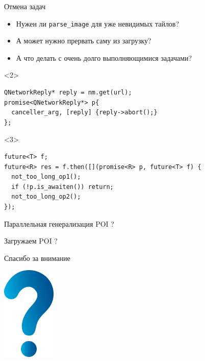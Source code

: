 \documentclass[aspectratio=169,pdf,hyperref={unicode},14pt]{beamer}
\begin{document}
\begin{frame}[fragile,t]{Отмена задач}
 \begin{itemize}[<+->]
  \item Нужен ли \texttt{parse\_image} для уже невидимых тайлов?
  \item А может нужно прервать саму из загрузку?
  \item А что делать с очень долго выполняющимися задачами?
 \end{itemize}
 \begin{onlyenv}<2>
 \begin{lstlisting}[style=cppcode]
QNetworkReply* reply = nm.get(url);
promise<QNetworkReply*> p{
  canceller_arg, [reply] {reply->abort();}
};
 \end{lstlisting}
 \end{onlyenv}
 \begin{onlyenv}<3>
 \begin{lstlisting}[style=cppcode]
future<T> f;
future<R> res = f.then([](promise<R> p, future<T> f) {
  not_too_long_op1();
  if (!p.is_awaiten()) return;
  not_too_long_op2();
});
 \end{lstlisting}
 \end{onlyenv}
\end{frame}

\begin{frame}{Параллельная генерализация POI}
 ?
\end{frame}

\begin{frame}{Загружаем POI}
 ?
\end{frame}

\begin{frame}{Спасибо за внимание}
\centerline{\includegraphics[height=4.5cm]{question_mark_blue.png}}
\end{frame}
\end{document}
